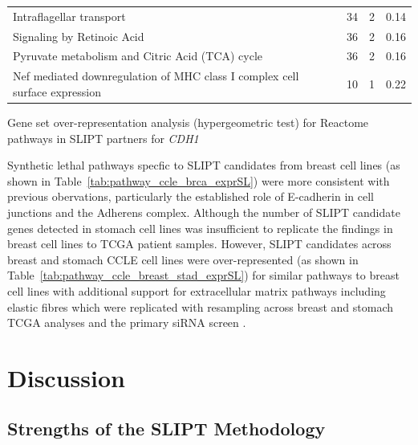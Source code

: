 \begin{table}[!tb]
{\begin{threeparttable}
\begin{tabular}{lccc}
  \rowcolor{black!10}
  Intraflagellar transport &  34 &   2 & 0.14 \\ 
  \rowcolor{black!5}
  Signaling by Retinoic Acid &  36 &   2 & 0.16 \\ 
  \rowcolor{black!10}
  Pyruvate metabolism and Citric Acid (TCA) cycle &  36 &   2 & 0.16 \\ 
  \rowcolor{black!5}
  Nef mediated downregulation of MHC class I complex cell surface expression &  10 &   1 & 0.22 \\ 
  \hline
\end{tabular}
\begin{tablenotes}
\raggedright \small
Gene set over-representation analysis (hypergeometric test) for Reactome pathways in SLIPT partners for \textit{CDH1}
\end{tablenotes}
\end{threeparttable}
}
\end{table}


Synthetic lethal pathways specfic to SLIPT candidates from breast cell lines (as shown in Table~\ref{tab:pathway_ccle_brca_exprSL}) were more consistent with previous obervations, particularly the established role of E-cadherin in cell junctions and the Adherens complex. Although the number of SLIPT candidate genes detected in stomach cell lines was insufficient to replicate the findings in breast cell lines to TCGA patient samples. However, SLIPT candidates across breast and stomach CCLE cell lines were over-represented (as shown in Table~\ref{tab:pathway_ccle_breast_stad_exprSL}) for similar pathways to breast cell lines with additional support for extracellular matrix pathways including elastic fibres which were replicated with resampling across breast and stomach TCGA analyses and the primary siRNA screen \citet{Telford2015}.

\FloatBarrier

\section{Discussion}

\subsection{Strengths of the SLIPT Methodology}

